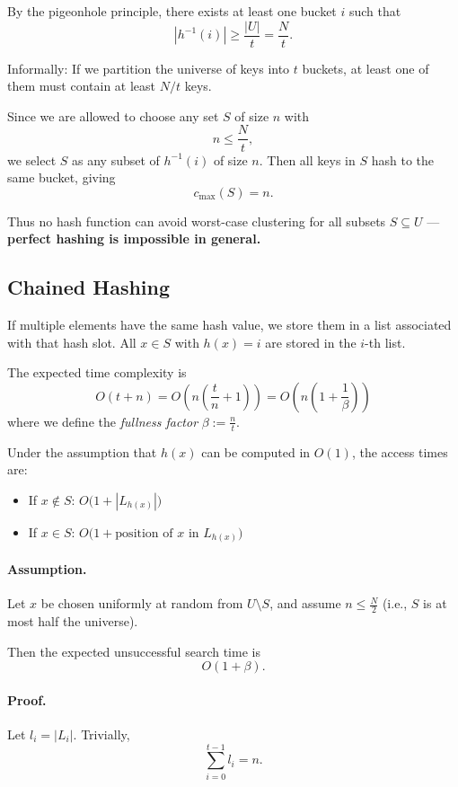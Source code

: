 \documentclass{article}
\begin{document}
By the pigeonhole principle, there exists at least one bucket $i$ such that
\[
|h^{-1}(i)| \ge \frac{|U|}{t} = \frac{N}{t}.
\]

Informally: If we partition the universe of keys into $t$ buckets, at least one of them must contain at least $N/t$ keys.

Since we are allowed to choose any set $S$ of size $n$ with
\[
n \le \frac{N}{t},
\]
we select $S$ as any subset of $h^{-1}(i)$ of size $n$.  
Then all keys in $S$ hash to the same bucket, giving
\[
c_{\max}(S) = n.
\]

Thus no hash function can avoid worst-case clustering for all subsets $S \subseteq U$ —  
\textbf{perfect hashing is impossible in general.}

\subsection{Chained Hashing}

If multiple elements have the same hash value, we store them in a list associated with that hash slot.  
All $x \in S$ with $h(x)=i$ are stored in the $i$-th list.

The expected time complexity is
\[
O(t+n) = O\!\left(n\left(\frac{t}{n}+1\right)\right)
  = O\!\left(n\left(1+\frac{1}{\beta}\right)\right)
\]
where we define the \emph{fullness factor} $\beta := \frac{n}{t}$.

Under the assumption that $h(x)$ can be computed in $O(1)$, the access times are:

\begin{itemize}
    \item If $x \notin S$: $O\big(1 + |L_{h(x)}|\big)$
    \item If $x \in S$: $O\big(1 + \text{position of $x$ in } L_{h(x)}\big)$
\end{itemize}

\paragraph{Assumption.}  
Let $x$ be chosen uniformly at random from $U \setminus S$, and assume $n \le \frac{N}{2}$ (i.e., $S$ is at most half the universe).

Then the expected unsuccessful search time is  
\[
O(1+\beta).
\]

\paragraph{Proof.}  
Let $l_i = |L_i|$. Trivially,
\[
\sum_{i=0}^{t-1} l_i = n.
\]
\end{document}
